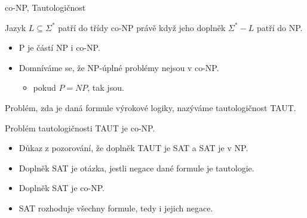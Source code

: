    \begin{frame}{co-NP, Tautologičnost}
        \begin{definition}
        Jazyk $L\subseteq \Sigma^*$ patří do třídy \alert{co-NP} právě když jeho doplněk $\Sigma^*-L$ patří do NP.
        \end{definition}
        \begin{itemize}
            \item P je částí NP i co-NP.
            \item Domníváme se, že NP-úplné problémy nejsou v co-NP.
            
            \begin{itemize}
                \item pokud $P=NP$, tak jsou.
            \end{itemize}
        \end{itemize}
        \begin{definition}[tautologičnost]
        Problém, zda je daná formule výrokové logiky, nazýváme \alert{tautologičnost TAUT}.
        \end{definition}
        \begin{theorem}
        Problém tautologičnosti TAUT je co-NP.
        \end{theorem}
        \begin{itemize}
            \item Důkaz z pozorování, že doplněk TAUT je SAT a SAT je v NP.
            \item Doplněk SAT je otázka, jestli negace dané formule je tautologie.
        \item Doplněk SAT je co-NP.
        \item SAT rozhoduje všechny formule, tedy i jejich negace.
        \end{itemize}
        \end{frame}
        
